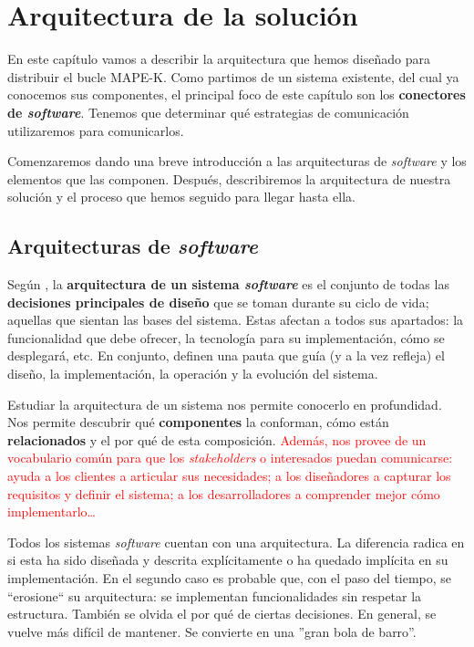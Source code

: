 \chapter{Arquitectura de la solución}

En este capítulo vamos a describir la arquitectura que hemos diseñado para distribuir el bucle MAPE-K. Como partimos de un sistema existente, del cual ya conocemos sus componentes, el principal foco de este capítulo son los \textbf{conectores de \emph{software}}. Tenemos que determinar qué estrategias de comunicación utilizaremos para comunicarlos.

Comenzaremos dando una breve introducción a las arquitecturas de \emph{software} y los elementos que las componen. Después, describiremos la arquitectura de nuestra solución y el proceso que hemos seguido para llegar hasta ella.

\section{Arquitecturas de \emph{software}}

Según \cite{taylorSoftwareArchitectureFoundations2009}, la \textbf{arquitectura de un sistema \emph{software}} es el conjunto de todas las \textbf{decisiones principales de diseño} que se toman durante su ciclo de vida; aquellas que sientan las bases del sistema. Estas afectan a todos sus apartados: la funcionalidad que debe ofrecer, la tecnología para su implementación, cómo se desplegará, etc. En conjunto, definen una pauta que guía (y a la vez refleja) el diseño, la implementación, la operación y la evolución del sistema.

Estudiar la arquitectura de un sistema nos permite conocerlo en profundidad. Nos permite descubrir qué \textbf{componentes} la conforman, cómo están \textbf{relacionados} y el por qué de esta composición. \cite{perryFoundationsStudySoftware1992} \textcolor{red}{Además, nos provee de un vocabulario común para que los \emph{stakeholders} o interesados puedan comunicarse: ayuda a los clientes a articular sus necesidades; a los diseñadores a capturar los requisitos y definir el sistema; a los desarrolladores a comprender mejor cómo implementarlo\dots}

Todos los sistemas \emph{software} cuentan con una arquitectura. La diferencia radica en si esta ha sido diseñada y descrita explícitamente o ha quedado implícita en su implementación. \cite{taylorSoftwareArchitectureFoundations2009} En el segundo caso es probable que, con el paso del tiempo, se ``erosione`` su arquitectura: se implementan funcionalidades sin respetar la estructura. También se olvida el por qué de ciertas decisiones. En general, se vuelve más difícil de mantener. Se convierte en una ''gran bola de barro''. \cite{footeBigBallMud1997}


